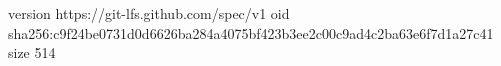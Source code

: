version https://git-lfs.github.com/spec/v1
oid sha256:c9f24be0731d0d6626ba284a4075bf423b3ee2c00c9ad4c2ba63e6f7d1a27c41
size 514
